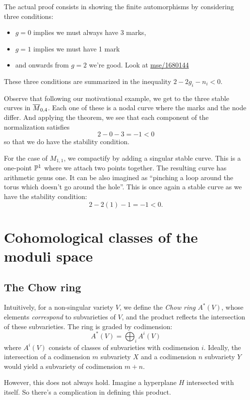 \documentclass[12pt]{memoir}
\begin{document}
\begin{ptcb}
    The actual proof consists in showing the finite automorphisms by considering three conditions:
    \begin{itemize}
        \item $g=0$ implies we must always have $3$ marks,
        \item $g=1$ implies we must have 1 mark 
        \item and onwards from $g=2$ we're good. Look at \href{https://math.stackexchange.com/questions/1680144/automorphism-group-of-genus-2-curve}{mse/1680144}
    \end{itemize}
    These three conditions are summarized in the inequality $2-2g_i-n_i<0$.
\end{ptcb}
\begin{Ex}
    Observe that following our motivational example, we get to the three stable curves in $\overline M_{0,4}$. Each one of these is a nodal curve where the marks and the node differ. And applying the theorem, we see that each component of the normalization satisfies
    $$2-0-3=-1<0$$
    so that we do have the stability condition. 
\end{Ex}

\begin{Ex}
    For the case of $M_{1,1}$, we compactify by adding a singular stable curve. This is a one-point $\mathbb{P}^1$ where we attach two points together. The resulting curve has arithmetic genus one. It can be also imagined as ``pinching a loop around the torus which doesn't go around the hole''. This is once again a stable curve as we have the stability condition:
    $$2-2(1)-1=-1<0.$$
\end{Ex}

\section{Cohomological classes of the moduli space}

\subsection{The Chow ring}
Intuitively, for a non-singular variety $V$, we define the \emph{Chow ring} $A^\ast(V)$, whose elements \emph{correspond} to subvarieties of $V$, and the product reflects the intersection of these subvarieties. The ring is graded by codimension:
$$A^\ast(V) = \bigoplus_i A^i(V)$$
where $A^i(V)$ consists of classes of subvarieties with codimension $i$. Ideally, the intersection of a codimension $m$ subvariety $X$ and a codimension $n$ subvariety $Y$ would yield a subvariety of codimension $m+n$.\par
However, this does not always hold. Imagine a hyperplane $H$ intersected with itself. So there's a complication in defining this product.
\end{document}
